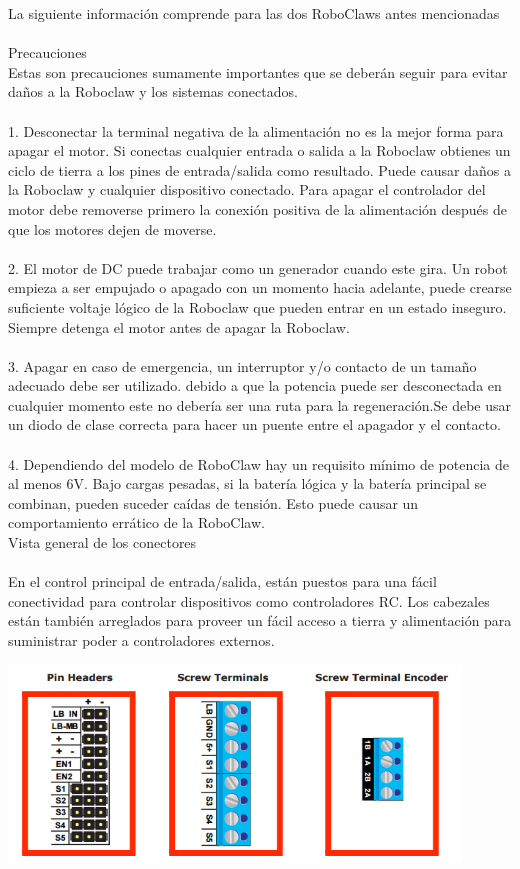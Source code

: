 \documentclass[a4paper]{book}
\begin{document}
La siguiente información comprende para las dos RoboClaws antes mencionadas \\
\\
Precauciones\\
Estas son precauciones sumamente importantes que se deberán seguir para evitar daños a la Roboclaw y los sistemas conectados.\\
\\
1. Desconectar la terminal negativa de la alimentación no es la mejor forma para apagar el motor. Si conectas cualquier entrada o salida a la Roboclaw obtienes un ciclo de tierra a los pines de entrada/salida como resultado. Puede causar daños a la Roboclaw y cualquier dispositivo conectado. Para apagar el controlador del motor debe removerse primero la conexión positiva de la alimentación después de que los motores dejen de moverse.\\
\\
2. El motor de DC puede trabajar como un generador cuando este gira. Un robot empieza a ser empujado o apagado con un momento hacia adelante, puede crearse suficiente voltaje lógico de la Roboclaw que pueden entrar en un estado inseguro. Siempre detenga el motor antes de apagar la Roboclaw.\\
\\
3. Apagar en caso de emergencia, un interruptor y/o contacto de un tamaño adecuado debe ser utilizado. debido a que la potencia puede ser desconectada en cualquier momento este no debería ser una ruta para la regeneración.Se debe usar un diodo de clase correcta para hacer un puente entre el apagador y el contacto.\\
\\
4. Dependiendo del modelo de RoboClaw hay un requisito mínimo de potencia de al menos 6V. Bajo cargas pesadas, si la batería lógica y la batería principal se combinan, pueden suceder caídas de tensión. Esto puede causar un comportamiento errático de la RoboClaw.\\
Vista general de los conectores\\
\\
En el control principal de entrada/salida, están puestos para una fácil conectividad para controlar dispositivos como controladores RC. Los cabezales están también arreglados para proveer un fácil acceso a tierra  y alimentación para suministrar poder a controladores externos.

\begin{center}
\includegraphics[width=0.9\textwidth]{Figures/Hardware/Partes/Pines.png}
\label{fig:Hardware:Partes:Pines}
\end{center}
\end{document}
